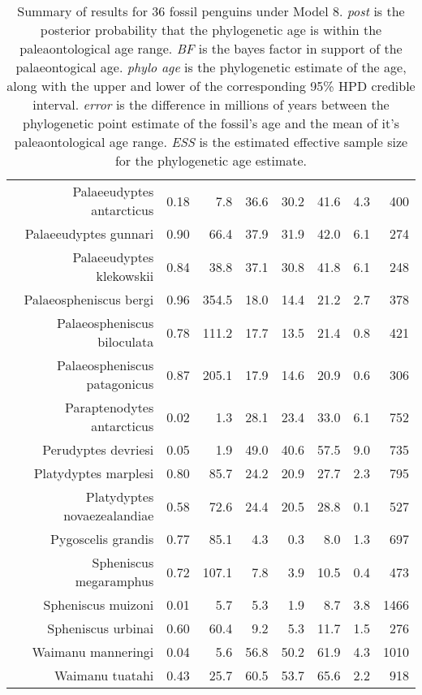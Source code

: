 \begin{table}[ht]
\begin{tabular}{rrrrrrrr}
  Palaeeudyptes antarcticus & 0.18 & 7.8 & 36.6 & 30.2 & 41.6 & 4.3 & 400 \\ 
  Palaeeudyptes gunnari & 0.90 & 66.4 & 37.9 & 31.9 & 42.0 & 6.1 & 274 \\ 
  Palaeeudyptes klekowskii & 0.84 & 38.8 & 37.1 & 30.8 & 41.8 & 6.1 & 248 \\ 
  Palaeospheniscus bergi & 0.96 & 354.5 & 18.0 & 14.4 & 21.2 & 2.7 & 378 \\ 
  Palaeospheniscus biloculata & 0.78 & 111.2 & 17.7 & 13.5 & 21.4 & 0.8 & 421 \\ 
  Palaeospheniscus patagonicus & 0.87 & 205.1 & 17.9 & 14.6 & 20.9 & 0.6 & 306 \\ 
  Paraptenodytes antarcticus & 0.02 & 1.3 & 28.1 & 23.4 & 33.0 & 6.1 & 752 \\ 
  Perudyptes devriesi & 0.05 & 1.9 & 49.0 & 40.6 & 57.5 & 9.0 & 735 \\ 
  Platydyptes marplesi & 0.80 & 85.7 & 24.2 & 20.9 & 27.7 & 2.3 & 795 \\ 
  Platydyptes novaezealandiae & 0.58 & 72.6 & 24.4 & 20.5 & 28.8 & 0.1 & 527 \\ 
  Pygoscelis grandis & 0.77 & 85.1 & 4.3 & 0.3 & 8.0 & 1.3 & 697 \\ 
  Spheniscus megaramphus & 0.72 & 107.1 & 7.8 & 3.9 & 10.5 & 0.4 & 473 \\ 
  Spheniscus muizoni & 0.01 & 5.7 & 5.3 & 1.9 & 8.7 & 3.8 & 1466 \\ 
  Spheniscus urbinai & 0.60 & 60.4 & 9.2 & 5.3 & 11.7 & 1.5 & 276 \\ 
  Waimanu manneringi & 0.04 & 5.6 & 56.8 & 50.2 & 61.9 & 4.3 & 1010 \\ 
  Waimanu tuatahi & 0.43 & 25.7 & 60.5 & 53.7 & 65.6 & 2.2 & 918 \\ 
   \hline
\end{tabular}
\caption{Summary of results for 36 fossil penguins under Model 8. {\em post} is the posterior probability that the phylogenetic age is within the paleaontological age range. {\em BF} is the bayes factor in support of the palaeontogical age. {\em phylo age} is the phylogenetic estimate of the age, along with the upper and lower of the corresponding 95\% HPD credible interval. {\em error} is the difference in millions of years between the phylogenetic point estimate of the fossil's age and the mean of it's paleaontological age range. {\em ESS} is the estimated effective sample size for the phylogenetic age estimate.} 
\label{fossilTable8}
\end{table}
